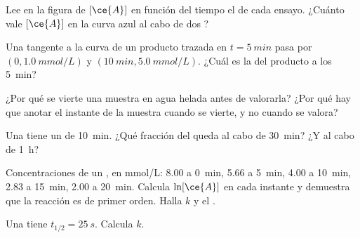 \begin{exercise}[$\star$]\label{exo:g12:reaction-rates:2}
Lee en la figura de $[\ce{A}]$ en función del tiempo el  de cada ensayo. ¿Cuánto vale $[\ce{A}]$ en la curva azul
al cabo de dos ?
\end{exercise}

\begin{exercise}[$\star$]\label{exo:g12:reaction-rates:3}
Una tangente a la curva de un producto trazada en $t = \qty{5}{min}$ pasa
por $(0, \qty{1.0}{mmol/L})$ y $(\qty{10}{min}, \qty{5.0}{mmol/L})$.
¿Cuál es la  del producto a los \qty{5}{min}?
\end{exercise}

\begin{exercise}[$\star$]\label{exo:g12:reaction-rates:4}
¿Por qué se vierte una muestra en agua helada antes de valorarla? ¿Por
qué hay que anotar el instante de la muestra cuando se vierte, y no
cuando se valora?
\end{exercise}

\begin{exercise}[$\star$]\label{exo:g12:reaction-rates:5}
Una  tiene un  de
\qty{10}{min}. ¿Qué fracción del  queda al cabo de
\qty{30}{min}? ¿Y al cabo de \qty{1}{h}?
\end{exercise}

\begin{exercise}[$\star\star$]\label{exo:g12:reaction-rates:6}
Concentraciones de un , en \si{mmol/L}: 8.00 a \qty{0}{min},
5.66 a \qty{5}{min}, 4.00 a \qty{10}{min}, 2.83 a \qty{15}{min}, 2.00 a
\qty{20}{min}. Calcula $\ln[\ce{A}]$ en cada instante y demuestra que la
reacción es de primer orden. Halla $k$ y el .
\end{exercise}

\begin{exercise}[$\star\star$]\label{exo:g12:reaction-rates:7}
Una  tiene $t_{1/2} = \qty{25}{s}$. Calcula $k$.
\end{exercise}

